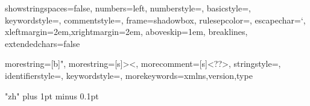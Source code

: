 \usepackage[slantfont,boldfont]{xeCJK}

\usepackage{geometry}
\usepackage{enumerate}
\usepackage[
	pdfstartview=FitH,
	CJKbookmarks=true,
	bookmarks=true,
	bookmarksnumbered=true,
	bookmarksopen=true,
	colorlinks=true,
	citecolor=blue,
	linkcolor=blue,
	anchorcolor=green,
	urlcolor=blue]{hyperref}
\usepackage{titlesec}
\usepackage{booktabs}
\usepackage{titletoc}
\usepackage{indentfirst}
\usepackage{fontspec}
\usepackage{xunicode}
\usepackage{xltxtra}
\usepackage{color}
\usepackage{xcolor}
\usepackage{graphicx}
\usepackage{subfig}

\usepackage{fancyhdr}
\pagestyle{plain}

\usepackage{listings}
\lstloadlanguages{}
\lstset
{
	showstringspaces=false,
	numbers=left,
	numberstyle=\tiny,
	basicstyle=\footnotesize,
	keywordstyle=\color{blue!70},
	commentstyle=\color{red!50!green!50!blue!50},
	frame=shadowbox,
	rulesepcolor=\color{red!20!green!20!blue!20},
	escapechar=`,
	xleftmargin=2em,xrightmargin=2em, aboveskip=1em,
	breaklines,
	extendedchars=false
}

{
	morestring=[b]",
	morestring=[s]{>}{<},
	morecomment=[s]{<?}{?>},
	stringstyle=\color{black},
	identifierstyle=\color{blue},
	keywordstyle=\color{cyan},
	morekeywords={xmlns,version,type}%
}

\usepackage[title,titletoc,header]{appendix}

\usepackage{pgf,tikz}
\usetikzlibrary{shapes,automata,snakes,backgrounds,arrows}
\usetikzlibrary{mindmap}



\XeTeXlinebreaklocale "zh"
\XeTeXlinebreakskip=0pt plus 1pt minus 0.1pt



\setmainfont{Monaco}
\setmonofont{Monaco}
\setsansfont{Monaco}

\geometry{left=2.75cm,right=2.5cm,top=2.5cm,bottom=2.5cm}

\renewcommand{\contentsname}{目录}     
\renewcommand{\abstractname}{摘要}
\renewcommand{\indexname}{索引}
\renewcommand{\listfigurename}{插图目录}
\renewcommand{\listtablename}{表格目录}
\renewcommand{\figurename}{图}
\renewcommand{\tablename}{表}
\renewcommand{\lstlistingname}{例程}
\renewcommand{\appendixname}{附录}
\renewcommand{\appendixpagename}{附录}
\renewcommand{\appendixtocname}{附录}
\renewcommand\refname{参考文献}

